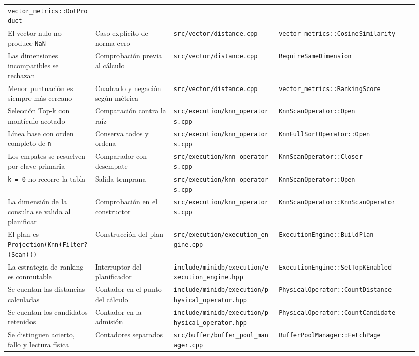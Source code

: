 \documentclass[11pt,a4paper]{article}
\begin{document}
\begin{landscape}
\begin{longtable}[]{@{}L{0.20\linewidth}L{0.18\linewidth}L{0.24\linewidth}L{0.32\linewidth}@{}}
\texttt{vector\_metrics::DotProduct} \\
El vector nulo no produce \texttt{NaN} & Caso explícito de norma cero &
\texttt{src/vector/distance.cpp} &
\texttt{vector\_metrics::CosineSimilarity} \\
Las dimensiones incompatibles se rechazan & Comprobación previa al
cálculo & \texttt{src/vector/distance.cpp} &
\texttt{RequireSameDimension} \\
Menor puntuación es siempre más cercano & Cuadrado y negación según
métrica & \texttt{src/vector/distance.cpp} &
\texttt{vector\_metrics::RankingScore} \\
Selección Top-k con montículo acotado & Comparación contra la raíz &
\texttt{src/execution/knn\_operators.cpp} &
\texttt{KnnScanOperator::Open} \\
Línea base con orden completo de \texttt{n} & Conserva todos y ordena &
\texttt{src/execution/knn\_operators.cpp} &
\texttt{KnnFullSortOperator::Open} \\
Los empates se resuelven por clave primaria & Comparador con desempate &
\texttt{src/execution/knn\_operators.cpp} &
\texttt{KnnScanOperator::Closer} \\
\texttt{k\ =\ 0} no recorre la tabla & Salida temprana &
\texttt{src/execution/knn\_operators.cpp} &
\texttt{KnnScanOperator::Open} \\
La dimensión de la consulta se valida al planificar & Comprobación en el
constructor & \texttt{src/execution/knn\_operators.cpp} &
\texttt{KnnScanOperator::KnnScanOperator} \\
El plan es \texttt{Projection(Knn(Filter?(Scan)))} & Construcción del
plan & \texttt{src/execution/execution\_engine.cpp} &
\texttt{ExecutionEngine::BuildPlan} \\
La estrategia de ranking es conmutable & Interruptor del planificador &
\texttt{include/minidb/execution/execution\_engine.hpp} &
\texttt{ExecutionEngine::SetTopKEnabled} \\
Se cuentan las distancias calculadas & Contador en el punto del cálculo
& \texttt{include/minidb/execution/physical\_operator.hpp} &
\texttt{PhysicalOperator::CountDistance} \\
Se cuentan los candidatos retenidos & Contador en la admisión &
\texttt{include/minidb/execution/physical\_operator.hpp} &
\texttt{PhysicalOperator::CountCandidate} \\
Se distinguen acierto, fallo y lectura física & Contadores separados &
\texttt{src/buffer/buffer\_pool\_manager.cpp} &
\texttt{BufferPoolManager::FetchPage} \\

\end{longtable}
\end{landscape}
\end{document}
